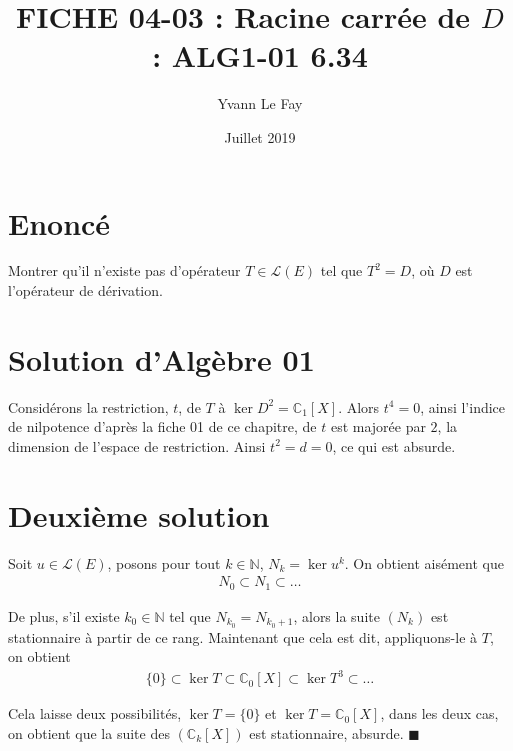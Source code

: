 \documentclass{article}
\newcommand*{\QED}{\hfill\ensuremath{\blacksquare}}%
\begin{document}
\title{FICHE 04-03 : Racine carrée de $D$ : ALG1-01 6.34}
\author{Yvann Le Fay}
\date{Juillet 2019}
\maketitle
\section*{Enoncé}
Montrer qu'il n'existe pas d'opérateur $T\in \mathcal{L}(E)$ tel que $T^2 = D$, où $D$ est l'opérateur de dérivation.
\section*{Solution d'Algèbre 01}
Considérons la restriction, $t$, de $T$ à $\ker D^2 = \mathbb{C}_1[X]$. Alors $t^4=0$, ainsi l'indice de nilpotence d'après la fiche 01 de ce chapitre, de $t$ est majorée par $2$, la dimension de l'espace de restriction. Ainsi $t^2 = d = 0$, ce qui est absurde.
\section*{Deuxième solution}
Soit $u\in\mathcal{L}(E)$, posons pour tout $k\in\mathbb{N}$, $N_k = \ker u^k$. On obtient aisément que
\begin{align*}
N_0\subset N_1\subset \ldots
\end{align*}

De plus, s'il existe $k_0\in\mathbb{N}$ tel que $N_{k_0}=N_{k_0+1}$, alors la suite $(N_k)$ est stationnaire à partir de ce rang. Maintenant que cela est dit, appliquons-le à $T$, on obtient
\begin{align*}
\{0\}\subset \ker T\subset \mathbb{C}_0[X]\subset \ker T^3 \subset \ldots
\end{align*}

Cela laisse deux possibilités, $\ker T = \{0\}$ et $\ker T = \mathbb{C}_0[X]$, dans les deux cas, on obtient que la suite des $(\mathbb{C}_k[X])$ est stationnaire, absurde.
\QED
\end{document}
